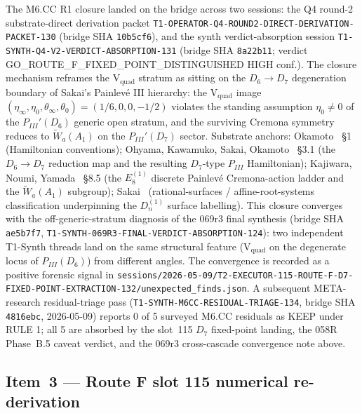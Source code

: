 \documentclass[11pt,a4paper]{article}
\theoremstyle{definition}
\theoremstyle{remark}
\begin{document}
The M6.CC R1 closure landed on the bridge across two sessions: the
Q4 round-2 substrate-direct derivation packet
\texttt{T1-OPERATOR-Q4-ROUND2-DIRECT-DERIVATION-PACKET-130}
(bridge SHA \texttt{10b5cf6}), and the synth verdict-absorption
session \texttt{T1-SYNTH-Q4-V2-VERDICT-ABSORPTION-131}
(bridge SHA \texttt{8a22b11}; verdict
\textsf{GO\_ROUTE\_F\_FIXED\_POINT\_DISTINGUISHED} HIGH conf.).
The closure mechanism reframes the V$_{\mathrm{quad}}$ stratum as
sitting on the $D_6 \to D_7$ degeneration boundary of Sakai's
Painlev\'e III hierarchy: the V$_{\mathrm{quad}}$ image
$(\eta_\infty, \eta_0, \theta_\infty, \theta_0) = (1/6, 0, 0, -1/2)$
violates the standing assumption $\eta_0 \neq 0$ of the
$P_{III}'(D_6)$ generic open stratum, and the surviving Cremona
symmetry reduces to $\widetilde{W}_a(A_1)$ on the
$P_{III}'(D_7)$ sector. Substrate anchors:
Okamoto~\cite{Okamoto1987} \S 1 (Hamiltonian conventions);
Ohyama, Kawamuko, Sakai, Okamoto~\cite{Ohyama2006} \S 3.1
(the $D_6 \to D_7$ reduction map and the resulting $D_7$-type
$P_{III}$ Hamiltonian);
Kajiwara, Noumi, Yamada~\cite{KNY2017} \S 8.5 (the $E_8^{(1)}$
discrete Painlev\'e Cremona-action ladder and the
$\widetilde{W}_a(A_1)$ subgroup);
Sakai~\cite{Sakai2001} (rational-surfaces / affine-root-systems
classification underpinning the $D_n^{(1)}$ surface labelling).
This closure converges with the off-generic-stratum diagnosis of
the 069r3 final synthesis (bridge SHA \texttt{ae5b7f7},
\texttt{T1-SYNTH-069R3-FINAL-VERDICT-ABSORPTION-124}): two
independent T1-Synth threads land on the same structural feature
(V$_{\mathrm{quad}}$ on the degenerate locus of $P_{III}(D_6)$) from
different angles. The convergence is recorded as a positive forensic
signal in \texttt{sessions/2026-05-09/T2-EXECUTOR-115-ROUTE-F-D7-FIXED-POINT-EXTRACTION-132/unexpected\_finds.json}.
A subsequent META-research residual-triage pass
(\texttt{T1-SYNTH-M6CC-RESIDUAL-TRIAGE-134}, bridge SHA
\texttt{4816ebc}, 2026-05-09) reports 0 of 5 surveyed M6.CC residuals
as KEEP under RULE 1; all 5 are absorbed by the slot~115 $D_7$
fixed-point landing, the 058R Phase~B.5 caveat verdict, and the
069r3 cross-cascade convergence note above.

\subsection{Item~3 --- Route F slot 115 numerical re-derivation}
\label{sec:closure-cascade-route-f}
\end{document}

